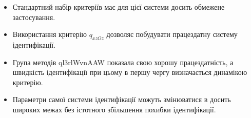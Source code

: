 \begin{itemize}

  \item
    Стандартний набір критеріїв має для цієї системи досить
    обмежене застосування.

  \item
    Використання критерію
    $ q_{xzOz} $ дозволяє побудувати працездатну систему ідентифікації.

  \item
    Група методів ql3rlWvnAAW показала свою хорошу працездатність, а
    швидкість ідентифікації при цьому в першу чергу визначається
    динамікою критерію.

  \item
    Параметри самої системи ідентифікації можуть змінюватися
    в досить широких межах без істотного збільшення похибки
    ідентифікації.

\end{itemize}





